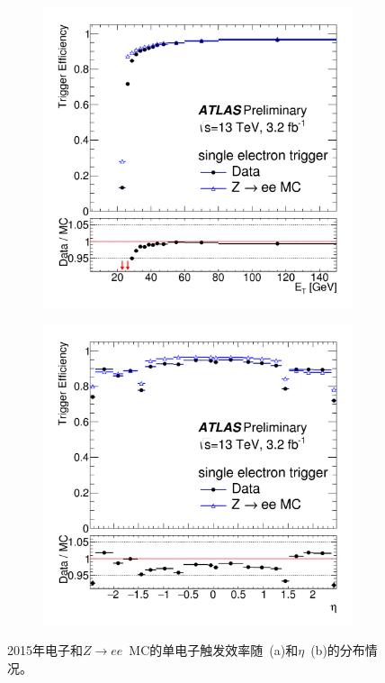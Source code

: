 \begin{figure}[h]
\begin{center}
\begin{subfigure}[b]{0.45\textwidth}
\centering
      \includegraphics[width=\textwidth]{fig/ele_trigger_eff_et.png}
     \caption{}
      \label{fig:ele_trigger_et_eff}
  \end{subfigure}
 \begin{subfigure}[b]{0.45\textwidth}
 \centering
      \includegraphics[width=\textwidth]{fig/ele_trigger_eff_eta.png}
      \caption{}
      \label{fig:ele_trigger_eta_eff}
  \end{subfigure}
\caption{2015年电子和$Z\rightarrow ee$~MC的单电子触发效率随\et~(a)和$\eta$~(b)的分布情况\cite{ATLAS-CONF-2016-024}。} 
 \label{fig:ele_trigger_eff}
\end{center}
\end{figure}

